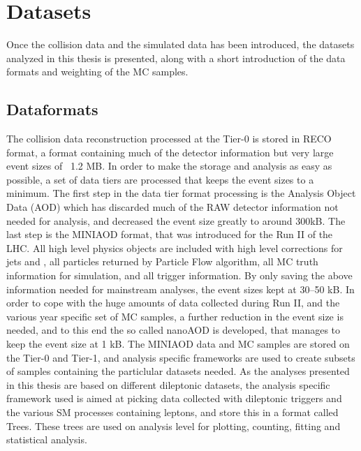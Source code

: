 \section{Datasets}
Once the collision data and the simulated data has been introduced, the datasets analyzed in this thesis is presented, along with a short introduction of the data formats and weighting of the MC samples. 
\subsection{Dataformats}
The collision data reconstruction processed at the Tier-0 is stored in RECO format, a format containing much of the detector information but very large event sizes of ~1.2 MB. 
In order to make the storage and analysis as easy as possible, a set of data tiers are processed that keeps the event sizes to a minimum.
The first step in the data tier format processing is the Analysis Object Data (AOD) which has discarded much of the RAW detector information not needed for analysis, and decreased the event size greatly to around 300kB. 
The last step is the MINIAOD format, that was introduced for the Run II of the LHC. 
All high level physics objects are included with high level corrections for jets and \ptmiss, all particles returned by Particle Flow algorithm, all MC truth information for simulation, and all trigger information. 
By only saving the above information needed for mainstream analyses, the event sizes kept at 30--50 kB. 
In order to cope with the huge amounts of data collected during Run II, and the various year specific set of MC samples, a further reduction in the event size is needed, and to this end the so called nanoAOD is developed, that manages to keep the event size at 1 kB.  
The MINIAOD data and MC samples are stored on the Tier-0 and Tier-1, and analysis specific frameworks are used to create subsets of samples containing the particlular datasets needed. 
As the analyses presented in this thesis are based on different dileptonic datasets, the analysis specific framework used is aimed at picking data collected with dileptonic triggers and the various SM processes containing leptons, and store this in a format called Trees. 
These trees are used on analysis level for plotting, counting, fitting and statistical analysis.      
